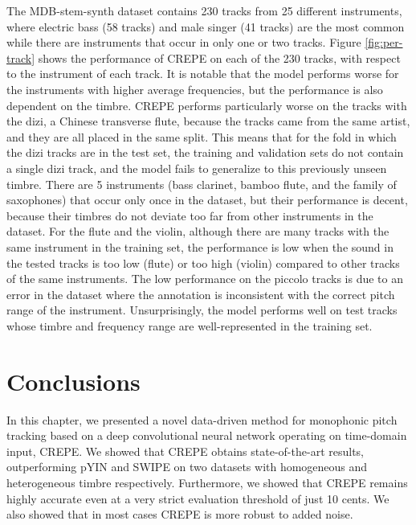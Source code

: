 The MDB-stem-synth dataset contains 230 tracks from 25 different instruments, where electric bass (58 tracks) and male singer (41 tracks) are the most common while there are instruments that occur in only one or two tracks.
Figure \ref{fig:per-track} shows the performance of CREPE on each of the 230 tracks, with respect to the instrument of each track.
It is notable that the model performs worse for the instruments with higher average frequencies, but the performance is also dependent on the timbre.
CREPE performs particularly worse on the tracks with the dizi, a Chinese transverse flute, because the tracks came from the same artist, and they are all placed in the same split.
This means that for the fold in which the dizi tracks are in the test set, the training and validation sets do not contain a single dizi track, and the model fails to generalize to this previously unseen timbre.
There are 5 instruments (bass clarinet, bamboo flute, and the family of saxophones) that occur only once in the dataset, but their performance is decent, because their timbres do not deviate too far from other instruments in the dataset.
For the flute and the violin, although there are many tracks with the same instrument in the training set, the performance is low when the sound in the tested tracks is too low (flute) or too high (violin) compared to other tracks of the same instruments.
The low performance on the piccolo tracks is due to an error in the dataset where the annotation is inconsistent with the correct pitch range of the instrument.
Unsurprisingly, the model performs well on test tracks whose timbre and frequency range are well-represented in the training set.


\section{Conclusions}

In this chapter, we presented a novel data-driven method for monophonic pitch tracking based on a deep convolutional neural network operating on time-domain input, CREPE.
We showed that CREPE obtains state-of-the-art results, outperforming pYIN and SWIPE on two datasets with homogeneous and heterogeneous timbre respectively.
Furthermore, we showed that CREPE remains highly accurate even at a very strict evaluation threshold of just 10 cents.
We also showed that in most cases CREPE is more robust to added noise.


